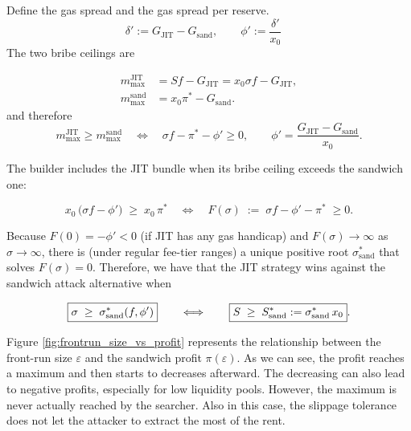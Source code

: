 \documentclass[a4paper,11pt]{article}
\begin{document}

Define the gas spread and the gas spread per reserve.
\begin{equation}
\delta' := G_{\text{JIT}}-G_{\text{sand}},\qquad
\phi'   := \frac{\delta'}{x_{0}}\quad
\end{equation}
The two bribe ceilings are

\[
\begin{aligned}
m_{\max}^{\text{JIT}} 
   &= S f - G_{\text{JIT}}
   = x_0\sigma f - G_{\text{JIT}}, \\
m_{\max}^{\text{sand}} 
   &= x_0 \pi^* - G_{\text{sand}}.
\end{aligned}
\]
and therefore
\[
m_{\max}^{\text{JIT}} \ge m_{\max}^{\text{sand}}
\quad\Longleftrightarrow\quad
\sigma f - \pi^* - \phi' \ge 0,
\qquad
\phi'=\frac{G_{\text{JIT}}-G_{\text{sand}}}{x_0}.
\]

The builder includes the JIT bundle when its
bribe ceiling exceeds the sandwich one:

\begin{equation}
x_{0}\,\bigl(\sigma f - \phi'\bigr)
   \;\ge\;
x_{0}\,\pi^*
\quad\Longleftrightarrow\quad
F(\sigma)\;:=\;
\sigma f - \phi' - \pi^*\;\ge 0.
\end{equation}

Because \(F(0)=-\phi' < 0\) (if JIT has any gas handicap)
and \(F(\sigma)\to \infty\) as \(\sigma\to\infty\),
there is (under regular fee-tier ranges) a unique positive root
\(\sigma_{\text{sand}}^{\ast}\) that solves \(F(\sigma)=0\). Therefore, we have that the JIT strategy wins against the sandwich attack alternative when

\begin{equation}
\boxed{%
   \sigma \;\ge\; \sigma_{\text{sand}}^{\ast}(f,\phi')
}
\qquad\Longleftrightarrow\qquad
\boxed{%
   S      \;\ge\; S_{\text{sand}}^{\ast}:=
            \sigma_{\text{sand}}^{\ast}\,x_{0}
}.
\end{equation}

Figure \ref{fig:frontrun_size_vs_profit} represents the relationship between the front-run size $\varepsilon$ and the sandwich profit $\pi(\varepsilon)$. As we can see, the profit reaches a maximum and then starts to decreases afterward. The decreasing can also lead to negative profits, especially for low liquidity pools. However, the maximum is never actually reached by the searcher. Also in this case, the slippage tolerance does not let the attacker to extract the most of the rent.
\end{document}

